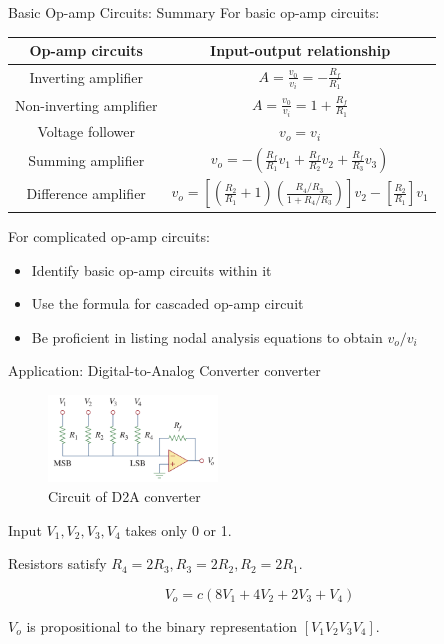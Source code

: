 \documentclass{beamer}
\begin{document}
\begin{frame}{Basic Op-amp Circuits: Summary}
For basic op-amp circuits:
\begin{table}[]
    \centering
    \begin{tabular}{cc}
        \toprule
        Op-amp circuits & Input-output relationship\\
        \midrule
        Inverting amplifier & $A = \frac{v_0}{v_i} = -\frac{R_f}{R_1}$\\
        Non-inverting amplifier & $A = \frac{v_0}{v_i} = 1 + \frac{R_f}{R_1}$\\
        Voltage follower & $v_o=v_i$\\
        Summing amplifier & $v_o = -(\frac{R_f}{R_1}v_1 + \frac{R_f}{R_2}v_2 + \frac{R_f}{R_3}v_3)$\\
        Difference amplifier & $v_o = \left[ (\frac{R_2}{R_1}+1)(\frac{R_4/R_3}{1+R_4/R_3})\right]v_2 - \left[\frac{R_2}{R_1}\right]v_1$\\
        \bottomrule
    \end{tabular}
\end{table}

For complicated op-amp circuits:
\begin{itemize}
    \item Identify basic op-amp circuits within it
    \item Use the formula for cascaded op-amp circuit
    \item Be proficient in listing nodal analysis equations to obtain $v_o/v_i$
\end{itemize}
    
\end{frame}

\begin{frame}{Application: Digital-to-Analog Converter converter}

\begin{figure}[H]
    \centering
    \includegraphics[width=0.4\textwidth]{img_opamp/11_converter.png}
    \caption{Circuit of D2A converter}
\end{figure}

Input $V_1, V_2, V_3, V_4$ takes only 0 or 1.

Resistors satisfy $R_4 = 2R_3, R_3 = 2R_2, R_2=2R_1$.

$$V_o = c(8V_1+4V_2+2V_3+V_4)$$

$V_o$ is propositional to the binary representation $\left[V_1V_2V_3V_4\right]$.

\end{frame}
\end{document}
